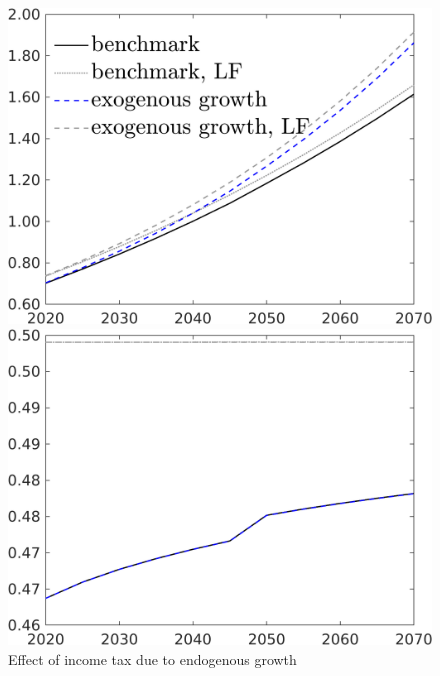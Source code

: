 \begin{figure}[h!!]
	\centering
	\caption{Effect of income tax due to endogenous growth }\label{fig:count_taul_xgr}
	\begin{minipage}[]{0.32\textwidth}
		\includegraphics[width=1\textwidth]{../../codding_model/own_basedOnFried/optimalPol_190722_tidiedUp/figures/all_10Aout22/CountXgrTaulLF_target_C_spillover0_sep1_extern0_PV1_etaa0.79_lgd1.png}
	\end{minipage}
	\begin{minipage}[]{0.32\textwidth}
		\includegraphics[width=1\textwidth]{../../codding_model/own_basedOnFried/optimalPol_190722_tidiedUp/figures/all_10Aout22/CountXgrTaulLF_target_hh_spillover0_sep1_extern0_PV1_etaa0.79_lgd0.png}

\end{minipage}
\end{figure}
